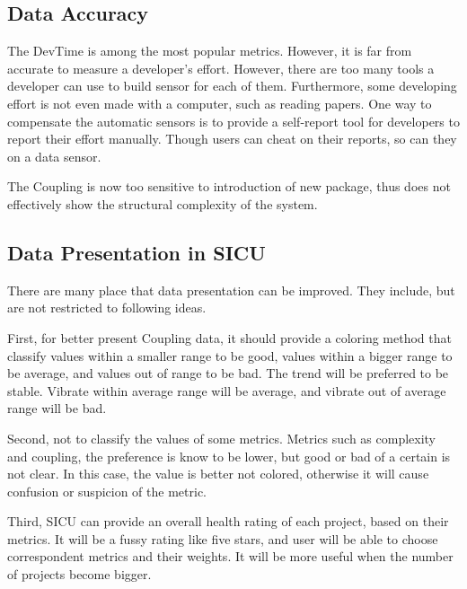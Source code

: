 \documentclass[11pt]{article}
\begin{document}
\subsection{Data Accuracy} 
The DevTime is among the most popular metrics. However, it is far from accurate to measure a developer's effort. However, there are too many tools a developer can use to build sensor for each of them. Furthermore, some developing effort is not even made with a computer, such as reading papers. One way to compensate the automatic sensors is to provide a self-report tool for developers to report their effort manually. Though users can cheat on their reports, so can they on a data sensor.

The Coupling is now too sensitive to introduction of new package, thus does not effectively show the structural complexity of the system.

\subsection{Data Presentation in SICU}
There are many place that data presentation can be improved. They include, but are not restricted to following ideas.

First, for better present Coupling data, it should provide a coloring method that classify values within a smaller range to be
good, values within a bigger range to be average, and values out of range to be bad. The trend will be preferred to be stable. Vibrate within average range will be average, and vibrate out of average range will be bad.

Second, not to classify the values of some metrics. Metrics such as complexity and coupling, the preference is know to be lower, but good or bad of a certain is not clear. In this case, the value is better not colored, otherwise it will cause confusion or suspicion of the metric.

Third, SICU can provide an overall health rating of each project, based on their metrics. It will be a fussy rating like five stars, and user will be able to choose correspondent metrics and their weights. It will be more useful when the number of projects become bigger.



\end{document}
